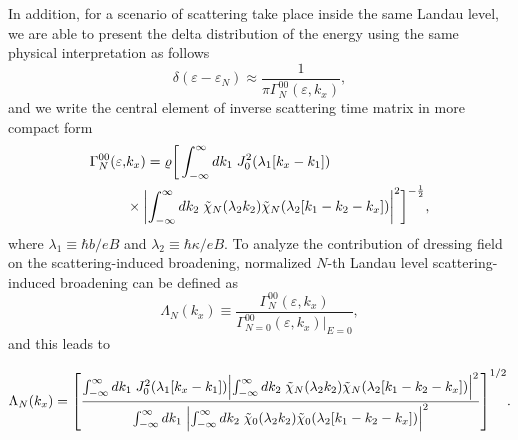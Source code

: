 In addition, for a scenario of scattering take place inside the same Landau level, we are able to present the delta distribution of the energy using the same physical interpretation \cite{dini16} as follows
\begin{equation} \label{eq_16}
 \delta(\varepsilon - \varepsilon_{N}) \approx
 \frac{1}{\pi \Gamma^{00}_{N}(\varepsilon,k_x)},
\end{equation}
and we write the central element of inverse scattering time matrix in more compact form
\begin{equation} \label{eq_17}
  \begin{aligned}
    \Gamma^{00}_{N}(\varepsilon,& k_x) =
    \varrho
    \bigg[
    \int_{-\infty}^{\infty} d {k}_1 \;
    J_0^2\qty(\lambda_1[{k}_x - {k}_1]) \\
    & \times
    \qty|
    \int_{-\infty}^{\infty} d{k}_2 \;
    \tilde{\chi}_{N}\qty(\lambda_2 k_2)
    \tilde{\chi}_{N}\qty(\lambda_2 \qty[{k}_1 - {k}_2 - {k}_x])|^2
    \bigg]^{-\frac{1}{2}},
  \end{aligned}
\end{equation}
where $ \lambda_1 \equiv \hbar b/eB$ and  $\lambda_2 \equiv \hbar \kappa/eB$.
To analyze the contribution of dressing field on the scattering-induced broadening, normalized $N$-th Landau level scattering-induced broadening can be defined as
\begin{equation} \label{eq_18}
    \Lambda_N(k_x) \equiv
    \frac{\Gamma^{00}_{N}(\varepsilon,k_x)}{\Gamma^{00}_{N=0}(\varepsilon,k_x)\big|_{E=0}},
\end{equation}
and this leads to
\begin{widetext}
\begin{equation} \label{eq_19}
    \Lambda_N (k_x) =
    \qty[
    \frac
    {\int_{-\infty}^{\infty} d {k}_1 \;
    J_0^2\qty(\lambda_1[{k}_x - {k}_1])
    \qty|
    \int_{-\infty}^{\infty} d{k}_2 \;
    \tilde{\chi}_{N}\qty(\lambda_2 k_2)
    \tilde{\chi}_{N}\qty(\lambda_2 \qty[{k}_1 - {k}_2 - {k}_x])|^2}
    {\int_{-\infty}^{\infty} d {k}_1 \;
    \qty|
    \int_{-\infty}^{\infty} d{k}_2 \;
    \tilde{\chi}_{0}\qty(\lambda_2 k_2)
    \tilde{\chi}_{0}\qty(\lambda_2 \qty[{k}_1 - {k}_2 - {k}_x])|^2}
    ]^{1/2}.
\end{equation}
\end{widetext}

